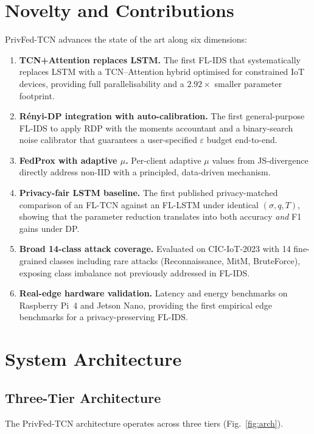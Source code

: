 \documentclass[conference]{IEEEtran}
\newcommand{\eps}{\varepsilon}
\begin{document}
\section{Novelty and Contributions}\label{sec:novelty}
PrivFed-TCN advances the state of the art along six dimensions:
\begin{enumerate}
\item \textbf{TCN+Attention replaces LSTM.} The first FL-IDS that
      systematically replaces LSTM with a TCN--Attention hybrid
      optimised for constrained IoT devices, providing full
      parallelisability and a $2.92\times$ smaller parameter
      footprint.
\item \textbf{R\'enyi-DP integration with auto-calibration.} The first
      general-purpose FL-IDS to apply RDP with the moments accountant
      and a binary-search noise calibrator that guarantees a
      user-specified $\eps$ budget end-to-end.
\item \textbf{FedProx with adaptive $\mu$.} Per-client adaptive
      $\mu$ values from JS-divergence directly address non-IID with a
      principled, data-driven mechanism.
\item \textbf{Privacy-fair LSTM baseline.} The first published
      privacy-matched comparison of an FL-TCN against an FL-LSTM under
      identical $(\sigma, q, T)$, showing that the parameter
      reduction translates into both accuracy \emph{and} F1 gains
      under DP.
\item \textbf{Broad 14-class attack coverage.} Evaluated on CIC-IoT-2023
      with 14 fine-grained classes including rare attacks
      (Reconnaissance, MitM, BruteForce), exposing class imbalance
      not previously addressed in FL-IDS.
\item \textbf{Real-edge hardware validation.} Latency and energy
      benchmarks on Raspberry Pi~4 and Jetson Nano, providing the
      first empirical edge benchmarks for a privacy-preserving FL-IDS.
\end{enumerate}

\section{System Architecture}\label{sec:arch}

\subsection{Three-Tier Architecture}
The PrivFed-TCN architecture operates across three tiers
(Fig.~\ref{fig:arch}).
\end{document}
